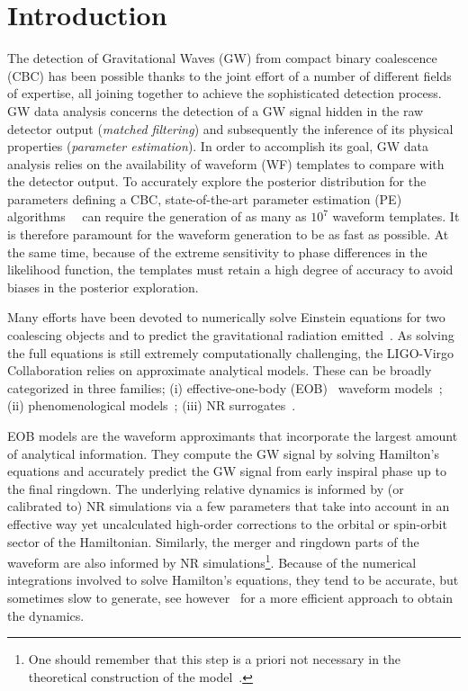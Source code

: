 \documentclass[twocolumn,showpacs,preprintnumbers,nofootinbib,prd,
superscriptaddress,10pt]{revtex4-1}
\begin{document}
\section{Introduction}
The detection of Gravitational Waves (GW) from compact binary coalescence (CBC) has been possible thanks to the joint effort of a number of different fields of expertise, all joining together to achieve the sophisticated detection process. GW data analysis concerns the detection of a GW signal hidden in the raw detector output (\textit{matched filtering}) and subsequently the inference of its physical properties (\textit{parameter estimation}). In order to accomplish its goal, GW data analysis relies on the availability of waveform (WF) templates to compare with the detector output.
To accurately explore the posterior distribution for the parameters defining a CBC, state-of-the-art parameter estimation (PE) algorithms~\cite{Aasi:2013jjl}~\cite{Veitch2014wba} can require the generation of as many as $10^7$ waveform templates. It is therefore paramount for the waveform generation to be as fast as possible. At the same time, because of the extreme sensitivity to phase differences in the likelihood  function, 
the templates must retain a high degree of accuracy to avoid biases in the posterior exploration.

Many efforts have been devoted to numerically solve Einstein equations for two coalescing objects and 
to predict the gravitational radiation emitted~\cite{Boyle:2019kee,Healy:2019jyf,Healy:2020vre}.
As solving the full equations is still extremely computationally challenging, the LIGO-Virgo Collaboration 
relies on approximate analytical models. 
These can be broadly categorized in  three families; (i) effective-one-body (EOB)~\cite{Buonanno:2000ef} 
waveform models~\cite{Damour:2009kr,Nagar:2020pcj,Chiaramello:2020ehz,Ossokine:2020kjp}; (ii) phenomenological 
models~\cite{Khan:2015jqa,Pratten:2020ceb,Estelles:2020osj}; (iii) NR surrogates~\cite{Varma:2018mmi,Williams:2019vub,Varma:2019csw,Rifat:2019ltp,Khan:2020fso}.

EOB models are the waveform approximants that incorporate the largest amount of analytical information.
They compute the GW signal by solving Hamilton's equations  and accurately predict the 
GW signal from early inspiral phase up to the final ringdown. The underlying relative dynamics
is informed by (or calibrated to) NR simulations via a few parameters that take into account 
in an effective way yet uncalculated high-order corrections to the orbital or spin-orbit sector 
of the Hamiltonian. Similarly, the merger and ringdown parts of the waveform are also informed by NR 
simulations\footnote{One should remember that this step is a priori not necessary in the theoretical 
construction of the model~\cite{Buonanno:2000ef,Damour:2007xr,Damour:2009wj}.}.
Because of the numerical integrations involved to solve Hamilton's equations, they tend to 
be accurate, but sometimes slow to generate, see however~\cite{Nagar:2018gnk} for a 
more efficient approach to obtain the dynamics.
\end{document}
